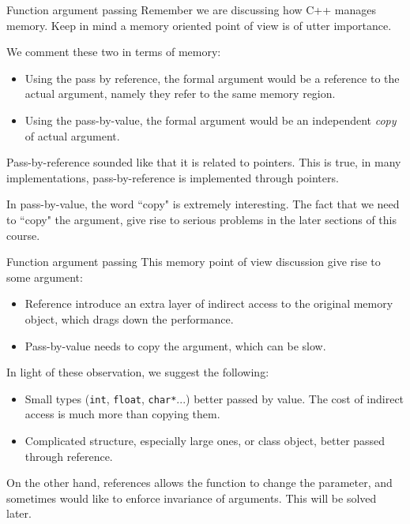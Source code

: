\begin{frame}[fragile]{Function argument passing}
Remember we are discussing how C++ manages memory. Keep in mind a memory oriented point of view is of utter importance.

We comment these two in terms of memory:
\begin{itemize}
	\item Using the pass by reference, the formal argument would be a reference to the actual argument, namely they refer to the same memory region.  
	\item Using the pass-by-value, the formal argument would be an independent \textit{copy} of actual argument. 
\end{itemize}

Pass-by-reference sounded like that it is related to pointers. This is true, in many implementations, pass-by-reference is implemented through pointers.

In pass-by-value, the word ``copy" is extremely interesting. The fact that we need to ``copy" the argument, give rise to serious problems in the later sections of this course. 
\end{frame}

\begin{frame}{Function argument passing}
This memory point of view discussion give rise to some argument:
\begin{itemize}
	\item Reference introduce an extra layer of indirect access to the original memory object, which drags down the performance.
	\item Pass-by-value needs to copy the argument, which can be slow.
\end{itemize}

In light of these observation, we suggest the following:

\begin{itemize}
	\item Small types (\texttt{int}, \texttt{float}, \texttt{char*}...) better passed by value. The cost of indirect access is much more than copying them.
	\item Complicated structure, especially large ones, or class object, better passed through reference.
\end{itemize}

On the other hand, references allows the function to change the parameter, and sometimes would like to enforce invariance of arguments. This will be solved later.
\end{frame}

